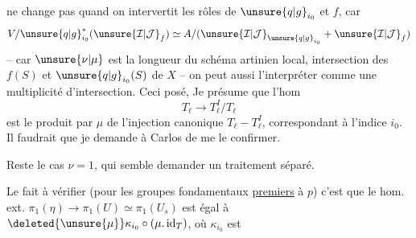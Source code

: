 ne change pas quand on intervertit les rôles de $\unsure{q|g}_{i_0}$ et $f$, car
\[
V/\unsure{q|g}_{i_0}^*(\unsure{\mathcal I|\mathcal J}_f)\simeq A/(\unsure{\mathcal I|\mathcal J}_{\unsure{q|g}_{i_0}}+\unsure{\mathcal I|\mathcal J}_f)
\]
-- car $\unsure{\nu|\mu}$ est la longueur du schéma artinien local, intersection des  $f(S)$ et $\unsure{q|g}_{i_0}(S)$ de $X$ -- on peut aussi l'interpréter comme une multiplicité d'intersection. Ceci posé, Je présume que l'hom
\[
T_\ell\longrightarrow T_\ell^I/T_\ell
\]
est le produit par $\mu$ de l'injection canonique $T_\ell-T_\ell^I$, correspondant à l'indice $i_0$. Il faudrait que je demande à Carlos de me le confirmer.

Reste le cas $\nu=1$, qui semble demander un traitement séparé.

Le fait à vérifier (pour les groupes fondamentaux \uline{premiers} à $p$) c'est que le hom. ext. $\pi_1(\eta)\longrightarrow\pi_1(U)\simeq\pi_1(U_s)$ est égal à $\deleted{\unsure{\mu}}\kappa_{i_0}\circ(\mu.\operatorname{id}_T)$, où $\kappa_{i_0}$ est
